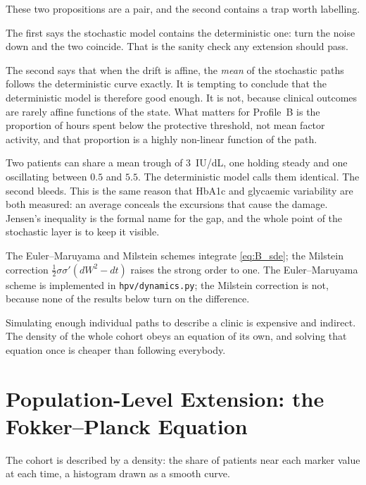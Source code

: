 \begin{reading}
These two propositions are a pair, and the second contains a trap worth
labelling.

The first says the stochastic model contains the deterministic one: turn the
noise down and the two coincide. That is the sanity check any extension should
pass.

The second says that when the drift is affine, the \emph{mean} of the
stochastic paths follows the deterministic curve exactly. It is tempting to
conclude that the deterministic model is therefore good enough. It is not,
because clinical outcomes are rarely affine functions of the state. What
matters for Profile~B is the proportion of hours spent below the protective
threshold, not mean factor activity, and that proportion is a highly
non-linear function of the path.

Two patients can share a mean trough of $3$~IU/dL, one holding steady and one
oscillating between $0.5$ and $5.5$. The deterministic model calls them
identical. The second bleeds. This is the same reason that HbA1c and glycaemic
variability are both measured: an average conceals the excursions that cause
the damage. Jensen's inequality is the formal name for the gap, and the whole
point of the stochastic layer is to keep it visible.
\end{reading}

\begin{remark}
The Euler--Maruyama and Milstein schemes integrate \eqref{eq:B_sde}; the Milstein
correction $\tfrac12\sigma\sigma'(dW^2-dt)$ raises the strong order to one. The
Euler--Maruyama scheme is implemented in \texttt{hpv/dynamics.py}; the Milstein
correction is not, because none of the results below turn on the difference.
\end{remark}

Simulating enough individual paths to describe a clinic is expensive and
indirect. The density of the whole cohort obeys an equation of its own, and
solving that equation once is cheaper than following everybody.

\section{Population-Level Extension: the Fokker--Planck Equation}
\label{sec:B_fp}

The cohort is described by a density: the share of patients near each marker
value at each time, a histogram drawn as a smooth curve.

